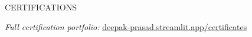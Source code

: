 \documentclass{resume} %
\begin{document}

\begin{rSection}{CERTIFICATIONS}
\vspace{-1.25em}
    \item \textit{Full certification portfolio:} \href{https://deepak-prasad.streamlit.app/certificates}{deepak-prasad.streamlit.app/certificates}
\end{rSection}
\end{document}
